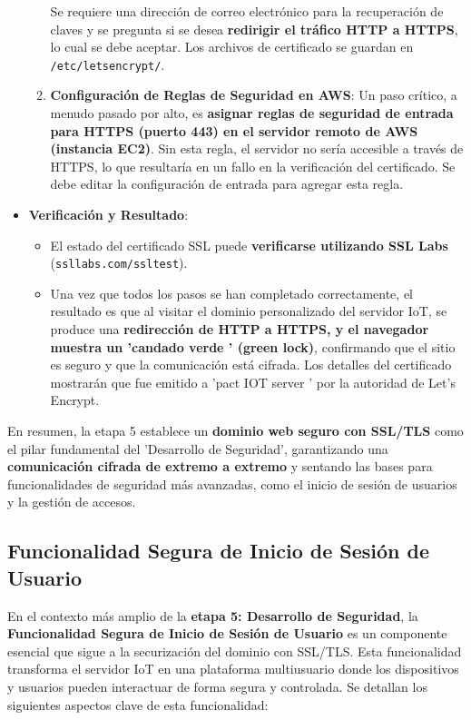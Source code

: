 \documentclass{report}
\begin{document}
\begin{itemize}
\begin{enumerate}
    Se requiere una dirección de correo electrónico para la recuperación de claves y se pregunta si se desea \textbf{redirigir el tráfico HTTP a HTTPS}, 
    lo cual se debe aceptar. Los archivos de certificado se guardan en \verb|/etc/letsencrypt/|.
        \item \textbf{Configuración de Reglas de Seguridad en AWS}: Un paso crítico, a menudo pasado por alto, es \textbf{asignar reglas de seguridad de 
        entrada para HTTPS (puerto 443) en el servidor remoto de AWS (instancia EC2)}. Sin esta regla, el servidor no sería accesible a través de HTTPS, 
        lo que resultaría en un fallo en la verificación del certificado. Se debe editar la configuración de entrada para agregar esta regla.
    \end{enumerate}
    \item \textbf{Verificación y Resultado}:
    \begin{itemize}
    \item El estado del certificado SSL puede \textbf{verificarse utilizando SSL Labs} (\verb|ssllabs.com/ssltest|).
        \item Una vez que todos los pasos se han completado correctamente, el resultado es que al visitar el dominio personalizado del servidor IoT, se 
        produce una \textbf{redirección de HTTP a HTTPS, y el navegador muestra un  'candado verde ' (green lock)}, confirmando que el sitio es seguro y 
        que la comunicación está cifrada. Los detalles del certificado mostrarán que fue emitido a  'pact IOT server ' por la autoridad de Let's Encrypt.
    \end{itemize}
\end{itemize}
En resumen, la etapa 5 establece un \textbf{dominio web seguro con SSL/TLS} como el pilar fundamental del  'Desarrollo de Seguridad', garantizando una 
\textbf{comunicación cifrada de extremo a extremo} y sentando las bases para funcionalidades de seguridad más avanzadas, como el inicio de sesión de 
usuarios y la gestión de accesos.

\subsection{Funcionalidad Segura de Inicio de Sesión de Usuario}
En el contexto más amplio de la \textbf{etapa 5: Desarrollo de Seguridad}, la \textbf{Funcionalidad Segura de Inicio de Sesión de Usuario} es un 
componente esencial que sigue a la securización del dominio con SSL/TLS. Esta funcionalidad transforma el servidor IoT en una plataforma multiusuario 
donde los dispositivos y usuarios pueden interactuar de forma segura y controlada. Se detallan los siguientes aspectos clave de esta funcionalidad:
\end{document}
